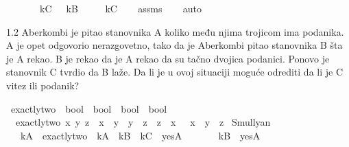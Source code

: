 \begin{isabellebody}
\begin{exercise}[subtitle=Raymond M. Smullyan: Logical Labyrinths]
\ \ \ \ \ \ \ {\isachardoublequoteopen}kC\ {\isasymlongleftrightarrow}\ {\isasymnot}\ kB{\isachardoublequoteclose}\isanewline
\ \ \ \ \ {\isachardoublequoteopen}kC{\isachardoublequoteclose}\isanewline
%
\isadelimproof
\ \ %
\endisadelimproof
%
\isatagproof
{}\isamarkupfalse%
\ assms\isanewline
\ \ \isamarkupfalse%
\ auto%
\endisatagproof
{\isafoldproof}%
%
\isadelimproof
%
\endisadelimproof
%
\begin{isamarkuptext}%
1.2 Aberkombi je pitao 
          stanovnika A koliko među njima trojicom ima podanika. 
          A je opet odgovorio nerazgovetno,
          tako da je Aberkombi pitao stanovnika B šta je A rekao. 
          B je rekao da je A rekao da su tačno dvojica podanici. 
          Ponovo je stanovnik C tvrdio da B laže. 
          Da li je u ovoj situaciji moguće odrediti da li je C vitez ili podanik?%
\end{isamarkuptext}\isamarkuptrue%
\isamarkupfalse%
\ exactly{\isacharunderscore}{\kern0pt}two\ {\isacharcolon}{\kern0pt}{\isacharcolon}{\kern0pt}\ {\isachardoublequoteopen}bool\ {\isasymRightarrow}\ bool\ {\isasymRightarrow}\ bool\ {\isasymRightarrow}\ bool{\isachardoublequoteclose}\ \isanewline
\ \ {\isachardoublequoteopen}exactly{\isacharunderscore}{\kern0pt}two\ x\ y\ z\ {\isasymlongleftrightarrow}\ {\isacharparenleft}{\kern0pt}{\isacharparenleft}{\kern0pt}x\ {\isasymand}\ y{\isacharparenright}{\kern0pt}\ {\isasymor}\ {\isacharparenleft}{\kern0pt}y\ {\isasymand}\ z{\isacharparenright}{\kern0pt}\ {\isasymor}\ {\isacharparenleft}{\kern0pt}z\ {\isasymand}\ x{\isacharparenright}{\kern0pt}{\isacharparenright}{\kern0pt}\ {\isasymand}\ {\isasymnot}\ {\isacharparenleft}{\kern0pt}x\ {\isasymand}\ y\ {\isasymand}\ z{\isacharparenright}{\kern0pt}{\isachardoublequoteclose}\isanewline
\isanewline
{}\isamarkupfalse%
\ Smullyan{\isacharunderscore}{\kern0pt}{}{\isacharunderscore}{\kern0pt}{}{\isacharcolon}{\kern0pt}\isanewline
\ \ \ {\isachardoublequoteopen}kA\ {\isasymlongleftrightarrow}\ {\isacharparenleft}{\kern0pt}exactly{\isacharunderscore}{\kern0pt}two\ {\isacharparenleft}{\kern0pt}{\isasymnot}\ kA{\isacharparenright}{\kern0pt}\ {\isacharparenleft}{\kern0pt}{\isasymnot}\ kB{\isacharparenright}{\kern0pt}\ {\isacharparenleft}{\kern0pt}{\isasymnot}\ kC{\isacharparenright}{\kern0pt}\ {\isasymlongleftrightarrow}\ yesA{\isacharparenright}{\kern0pt}{\isachardoublequoteclose}\isanewline
\ \ \ \ \ \ \ {\isachardoublequoteopen}kB\ {\isasymlongleftrightarrow}\ yesA{\isachardoublequoteclose}\isanewline

\end{exercise}
\end{isabellebody}
